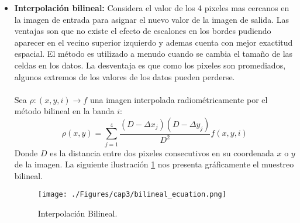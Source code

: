 \begin{itemize}
		\item \textbf{Interpolaci\'on bilineal:} Considera el valor de los 4 pixeles mas cercanos en la imagen de entrada para asignar el nuevo valor de la imagen de salida. Las ventajas son que no existe el efecto de escalones en los bordes pudiendo aparecer en el vecino superior izquierdo y ademas cuenta con mejor exactitud espacial. El m\'etodo es utilizado a menudo cuando se cambia el tama\~{n}o de las celdas en los datos. La desventaja es que como los pixeles son promediados, algunos extremos de los valores de los datos pueden perderse.\\~\\
		Sea $ \rho:(x,y,i) \longrightarrow f$ una imagen interpolada radiom\'etricamente por el m\'etodo bilineal en la banda $ i $:
		\begin{equation}
		\rho(x,y) = \sum_{j=1}^{4}\dfrac{(D-\Delta x_{j})(D-\Delta y_{j})}{D^{2}}f(x,y,i)
		\end{equation}	
		Donde $ D $ es la distancia entre dos pixeles consecutivos en su coordenada $ x $ o $ y $ de la imagen.
		La siguiente ilustraci\'on \ref{fig:bilineal2} nos presenta gr\'aficamente el muestreo bilineal.
		    \begin{figure}[H]
		    	\centering
		    	\texttt{[image: ./Figures/cap3/bilineal\_ecuation.png]}
		    	\caption{Interpolaci\'on Bilineal.}
		    	\label{fig:bilineal2}
		    \end{figure}
		    

\end{itemize}
